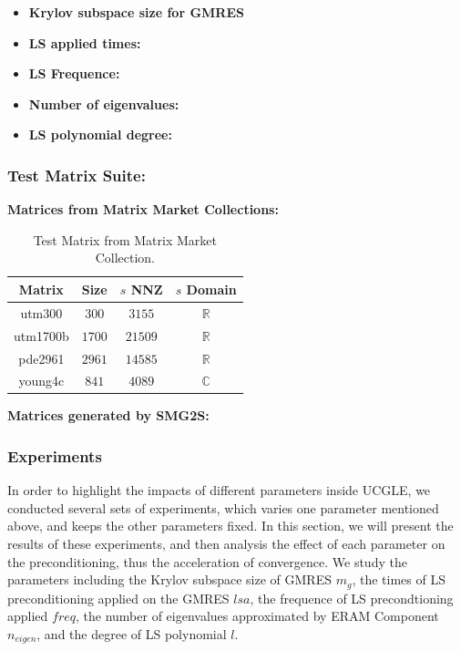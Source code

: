 \begin{itemize}
	\item \textbf{Krylov subspace size for GMRES }
	\item \textbf{LS applied times: }
	\item \textbf{LS Frequence:}
\end{itemize}

\begin{itemize}
	\item \textbf{Number of eigenvalues: }
\end{itemize}

\begin{itemize}
	\item \textbf{LS polynomial degree: }
\end{itemize}

\subsubsection{Test Matrix Suite: }

\textbf{Matrices from Matrix Market Collections: }
\begin{table}[htbp]
	\renewcommand{\arraystretch}{1.4}
	\small	
	\caption{Test Matrix from Matrix Market Collection.}
	\label{testmatrixforparameters}
	\centering
	\begin{tabular}{c|c|c|c}
		\toprule
		Matrix  & Size & $s$ NNZ & $s$ Domain\\
		\midrule
		utm300  & $300$ & $3155$ &$\mathbb{R}$ \\
		utm1700b & $1700$ & $21509$  & $\mathbb{R}$ \\
		pde2961 & $2961$ & $14585$& $\mathbb{R}$ \\
		young4c & $841$ & $4089$& $\mathbb{C}$ \\
		\bottomrule
	\end{tabular}
\end{table}

\textbf{Matrices generated by SMG2S: }

\subsubsection{Experiments}

In order to highlight the impacts of different parameters inside UCGLE, we conducted several sets of experiments, which varies one parameter mentioned above, and keeps the other parameters fixed. In this section, we will present the results of these experiments, and then analysis the effect of each parameter on the preconditioning, thus the acceleration of convergence. We study the parameters including the Krylov subspace size of GMRES $m_g$, the times of LS preconditioning applied on the GMRES $lsa$, the frequence of LS precondtioning applied $freq$, the number of eigenvalues approximated by ERAM Component $n_{eigen}$, and the degree of LS polynomial $l$.

